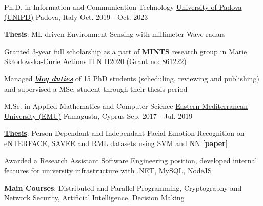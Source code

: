 

\begin{cventries}

  \cventry
    {Ph.D. in Information and Communication Technology} %
    {\href{https://www.unipd.it/}{University of Padova (UNIPD)}} %
    {Padova, Italy} %
    {Oct. 2019 - Oct. 2023} %
    {
      \begin{cvitems} %
        \item {\textbf{Thesis}: ML-driven Environment Sensing with millimeter-Wave radars}
        \item {Granted 3-year full scholarship as a part of \href{https://www.b5g-mints.eu/}{\textbf{MINTS}} research group in \href{https://cordis.europa.eu/project/id/861222}{Marie Skłodowska-Curie Actions ITN H2020 (Grant no: 861222)}}
        \item {Managed \href{https://b5g-mints.eu/blog/}{\textit{\textbf{blog duties}}} of 15 PhD students (scheduling, reviewing and publishing) and supervised a MSc. student through their thesis period}
      \end{cvitems}
    }
  
  \cventry
    {M.Sc. in Applied Mathematics and Computer Science} %
    {\href{https://www.emu.edu.tr/en}{Eastern Mediterranean University (EMU)}} %
    {Famagusta, Cyprus} %
    {Sep. 2017 - Jul. 2019} %
    {
      \begin{cvitems} %
        \item {\href{http://i-rep.emu.edu.tr:8080/xmlui/handle/11129/5291}{\textbf{Thesis}}: Person-Dependant and Independant Facial Emotion Recognition on eNTERFACE, SAVEE and RML datasets using SVM and NN \href{https://link.springer.com/article/10.1007/s11760-020-01830-0}{\textbf{[paper]}}}
        \item {Awarded a Research Assistant Software Engineering position, developed internal features for university infrastructure with .NET, MySQL, NodeJS}
        \item {\textbf{Main Courses}: Distributed and Parallel Programming, Cryptography and Network Security, Artificial Intelligence, Decision Making}
      \end{cvitems}
    }


\end{cventries}
